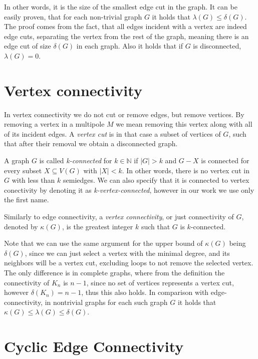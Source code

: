 \documentclass[12pt, twoside]{book}
\begin{document}
In other words, it is the size of the smallest edge cut in the graph. It can be easily proven, that for each non-trivial graph $G$ it holds that $\lambda(G)\leq\delta(G)$. The proof comes from the fact, that all edges incident with a vertex are indeed edge cuts, separating the vertex from the rest of the graph, meaning there is an edge cut of size $\delta(G)$ in each graph. Also it holds that if $G$ is disconnected, $\lambda(G)=0$.

\section{Vertex connectivity}

In vertex connectivity we do not cut or remove edges, but remove vertices. By removing a vertex in a multipole $M$ we mean removing this vertex along with all of its incident edges. A \textit{vertex cut} is in that case a subset of vertices of $G$, such that after their removal we obtain a disconnected graph.

A graph $G$ is called \textit{k-connected} for $k\in\mathbb{N}$ if $|G|>k$ and $G-X$ is connected for every subset $X\subseteq V(G)$ with $|X|<k$. In other words, there is no vertex cut in $G$ with less than $k$ semiedges. We can also specify that it is connected to vertex conectivity by denoting it as \textit{k-vertex-connected}, however in our work we use only the first name.

Similarly to edge connectivity, a \textit{vertex connectivity}, or just connectivity of $G$, denoted by $\kappa(G)$, is the greatest integer $k$ such that $G$ is $k$-connected.

Note that we can use the same argument for the upper bound of $\kappa(G)$ being $\delta(G)$, since we can just select a vertex with the minimal degree, and its neighbors will be a vertex cut, excluding loops to not remove the selected vertex. The only difference is in complete graphs, where from the definition the connectivity of $K_n$ is $n-1$, since no set of vertices represents a vertex cut, however $\delta(K_n)=n-1$, thus this also holds. In comparison with edge-connectivity, in nontrivial graphs for each such graph $G$ it holds that $\kappa(G)\leq \lambda(G) \leq \delta(G)$.

\section{Cyclic Edge Connectivity}\label{sec:cyclic-edge-connectivity}
\end{document}
